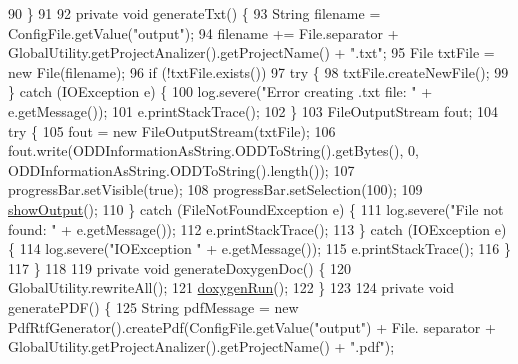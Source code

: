 \begin{DoxyCode}
90             \}
91 
92             \textcolor{keyword}{private} \textcolor{keywordtype}{void} generateTxt() \{
93                 String filename = ConfigFile.getValue(\textcolor{stringliteral}{"output"});
94                 filename += File.separator + GlobalUtility.getProjectAnalizer().getProjectName() + \textcolor{stringliteral}{".txt"};
95                 File txtFile = \textcolor{keyword}{new} File(filename);
96                 \textcolor{keywordflow}{if} (!txtFile.exists())
97                     \textcolor{keywordflow}{try} \{
98                         txtFile.createNewFile();                            
99                     \} \textcolor{keywordflow}{catch} (IOException e) \{
100                         log.severe(\textcolor{stringliteral}{"Error creating .txt file: "} + e.getMessage());
101                         e.printStackTrace();
102                     \}
103                 FileOutputStream fout;
104                 \textcolor{keywordflow}{try} \{
105                     fout = \textcolor{keyword}{new} FileOutputStream(txtFile);
106                     fout.write(ODDInformationAsString.ODDToString().getBytes(), 0, 
      ODDInformationAsString.ODDToString().length());
107                     progressBar.setVisible(\textcolor{keyword}{true});
108                     progressBar.setSelection(100);
109                     \hyperlink{classit_1_1isislab_1_1masonassisteddocumentation_1_1mason_1_1wizards_1_1_q___end_wizard_a4564b1098ec942795cbd022ccbe338e0}{showOutput}();
110                 \} \textcolor{keywordflow}{catch} (FileNotFoundException e) \{
111                     log.severe(\textcolor{stringliteral}{"File not found: "} + e.getMessage());
112                     e.printStackTrace();
113                 \} \textcolor{keywordflow}{catch} (IOException e) \{
114                     log.severe(\textcolor{stringliteral}{"IOException "} + e.getMessage());
115                     e.printStackTrace();
116                 \}
117             \}
118 
119             \textcolor{keyword}{private} \textcolor{keywordtype}{void} generateDoxygenDoc() \{
120                 GlobalUtility.rewriteAll();
121                 \hyperlink{classit_1_1isislab_1_1masonassisteddocumentation_1_1mason_1_1wizards_1_1_q___end_wizard_a42fd32637b3ac46154ab9c5ae720af05}{doxygenRun}();
122             \}
123 
124             \textcolor{keyword}{private} \textcolor{keywordtype}{void} generatePDF() \{
125                 String pdfMessage = \textcolor{keyword}{new} PdfRtfGenerator().createPdf(ConfigFile.getValue(\textcolor{stringliteral}{"output"}) + File.
      separator + GlobalUtility.getProjectAnalizer().getProjectName() + \textcolor{stringliteral}{".pdf"});

\end{DoxyCode}
